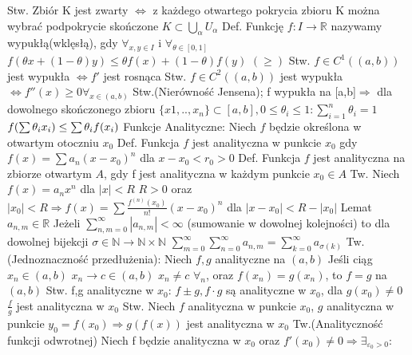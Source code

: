 \documentclass{article}
\begin{document}
Stw. Zbiór K jest zwarty $\Leftrightarrow$ z każdego otwartego pokrycia zbioru K można wybrać podpokrycie skończone 
$K\subset \bigcup\limits_{\alpha}U_{\alpha}$\newline
Def. Funkcję $f:I\rightarrow\mathbb{R}$ nazywamy wypukłą(wklęsłą), gdy $\forall_{x,y\in I}$ i $\forall_{\theta\in[0,1]}$
$f(\theta x+(1-\theta)y)\le\theta f(x)+(1-\theta)f(y)$ $(\ge)$\newline
Stw. $f\in C^1((a,b))$ jest wypukła $\Leftrightarrow f'$ jest rosnąca\newline
Stw. $f\in C^2((a,b))$ jest wypukła $\Leftrightarrow f''(x)\ge 0 \forall_{x\in (a,b)}$\newline
Stw.(Nierówność Jensena); f wypukła na [a,b]$\Rightarrow$ dla dowolnego skończonego zbioru $\{x1,..,x_n\}\subset[a,b],
0\le\theta_i\le 1:\sum\limits_{i=1}^{n}\theta_i=1$ $f(\sum\theta_ix_i)\le\sum\theta_if(x_i)\newline$
Funkcje Analityczne:\newline
Niech $f$ będzie określona w otwartym otoczniu $x_0$\newline
Def. Funkcja $f$ jest analityczna w punkcie $x_0$ gdy $f(x)=\sum a_n(x-x_0)^n$ dla $x-x_0<r_0>0$\newline
Def. Funkcja $f$ jest analityczna na zbiorze otwartym $A$, gdy f jest analityczna w każdym punkcie $x_0\in A$\newline
Tw. Niech $f(x)=a_nx^n$ dla $|x|<R$ $R>0$ oraz $|x_0|<R\Rightarrow f(x)=\sum\frac{f^{(n)}(x_0)}{n!}(x-x_0)^n$ dla $|x-x_0|<R-|x_0|$\newline
Lemat $a_{n,m}\in\mathbb{R}$ Jeżeli $\sum\limits_{n,m=0}^{\infty}|a_{n,m}|<\infty$ (sumowanie w dowolnej kolejności) to dla dowolnej bijekcji 
$\sigma\in \mathbb{N\rightarrow N\times N}$ $\sum\limits_{m=0}^{\infty}\sum\limits_{n=0}^{\infty}a_{n,m}=\sum\limits_{k=0}^{\infty}a_{\sigma(k)}$\newline
Tw.(Jednoznaczność przedłużenia): Niech $f,g$ analityczne na $(a,b)$ Jeśli ciąg $x_n\in(a,b)$ $x_n\rightarrow c\in(a,b)$ $x_n\neq c$ $\forall_n$,
oraz $f(x_n)=g(x_n)$, to $f=g$ na $(a,b)$\newline
Stw. f,g analityczne w $x_0$:\newline
$f\pm g,f\cdot g$ są analityczne w $x_0$, dla $g(x_0)\neq 0$ $\frac{f}{g}$ jest analityczna w $x_0$\newline
Stw. Niech $f$ analityczna w punkcie $x_0$, $g$ analityczna w punkcie $y_0=f(x_0)\Rightarrow g(f(x))$ jest analityczna w $x_0$\newline
Tw.(Analityczność funkcji odwrotnej) Niech f będzie analityczna w $x_0$ oraz $f'(x_0)\neq 0\Rightarrow\exists_{\varepsilon_0>0}:$
\end{document}
